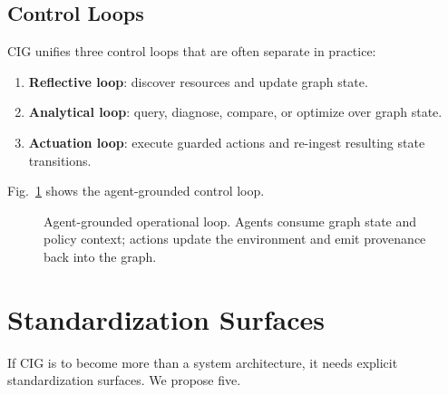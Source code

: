 \documentclass[conference]{IEEEtran}
\begin{document}
\subsection{Control Loops}
CIG unifies three control loops that are often separate in practice:
\begin{enumerate}
    \item \textbf{Reflective loop}: discover resources and update graph state.
    \item \textbf{Analytical loop}: query, diagnose, compare, or optimize over graph state.
    \item \textbf{Actuation loop}: execute guarded actions and re-ingest resulting state transitions.
\end{enumerate}

Fig.~\ref{fig:loop} shows the agent-grounded control loop.

\begin{figure}[t]
\centering
{}
\caption{Agent-grounded operational loop. Agents consume graph state and policy context; actions update the environment and emit provenance back into the graph.}
\label{fig:loop}
\end{figure}

\section{Standardization Surfaces}
If CIG is to become more than a system architecture, it needs explicit standardization surfaces. We propose five.
\end{document}
